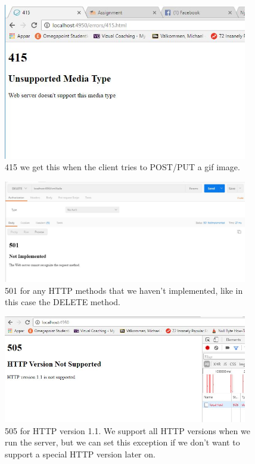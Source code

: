 \documentclass[a4paper,12pt]{article}
\numberwithin{figure}{section}
\begin{document}
\begin{figure}[h!]
	\centering
	\label{415}
	\includegraphics[width=0.95\textwidth,keepaspectratio]{img/415.jpg} 
	\caption{415 we get this when the client tries to POST/PUT a gif image. }
\end{figure}

\begin{figure}[h!]
	\centering
	\label{501}
	\includegraphics[width=0.95\textwidth,keepaspectratio]{img/501.jpg} 
	\caption{501 for any HTTP methods that we haven't implemented, like in this case the DELETE method.}
\end{figure}

\begin{figure}[h!]
	\centering
	\label{505}
	\includegraphics[width=0.95\textwidth,keepaspectratio]{img/505.jpg} 
	\caption{505 for HTTP version 1.1. We support all HTTP versions when we run the server, but we can set this exception if we don't want to support a special HTTP version later on.}
\end{figure}
\end{document}
